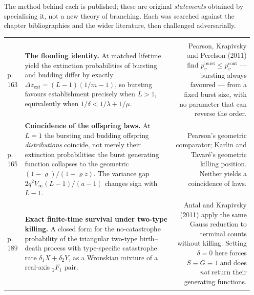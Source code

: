 
{\footnotesize\noindent
The method behind each is published; these are original \emph{statements} obtained by
specialising it, not a new theory of branching. Each was searched against the chapter
bibliographies and the wider literature, then challenged adversarially.\par}

\vspace{0.35\baselineskip}
{\footnotesize
\begin{xltabular}{\linewidth}{@{}WZN@{}}
\toprule
{} &  &  \\
\midrule
\endfirsthead
\toprule
{} &  &  \\
\midrule
\endhead
\bottomrule
\endlastfoot

\newline p.\,163 &
\textbf{The flooding identity.} At matched lifetime yield the extinction probabilities of
bursting and budding differ by exactly $\Delta z_{\mathrm{ext}}=(L-1)(1/m-1)$, so bursting
favours establishment precisely when $L>1$, equivalently when $1/\delta<1/\lambda+1/\mu$. &
Pearson, Krapivsky and Perelson (2011) find $p_v^{\mathrm{burst}}\le p_v^{\mathrm{cont}}$ ---
bursting always favoured --- from a fixed burst size, with no parameter that can reverse the
order. \\
\addlinespace[3pt]

\newline p.\,165 &
\textbf{Coincidence of the offspring laws.} At $L=1$ the bursting and budding offspring
\emph{distributions} coincide, not merely their extinction probabilities: the burst
generating function collapses to the geometric $(1-\varrho)/(1-\varrho z)$. The variance
gap $2q^{2}V_\infty(L-1)/(a-1)$ changes sign with $L-1$. &
Pearson's geometric comparator; Karlin and Tavar\'e's geometric killing position. Neither
yields a coincidence of laws. \\
\addlinespace[3pt]

\newline p.\,189 &
\textbf{Exact finite-time survival under two-type killing.} A closed form for the
no-catastrophe probability of the triangular two-type birth--death process with
type-specific catastrophe rate $\delta_1X+\delta_2Y$, as a Wronskian mixture of a
real-axis ${}_2F_1$ pair. &
Antal and Krapivsky (2011) apply the same Gauss reduction to terminal counts without
killing. Setting $\delta=0$ here forces $S\equiv G\equiv1$ and does \emph{not} return
their generating functions. \\
\addlinespace[3pt]


\end{xltabular}}

